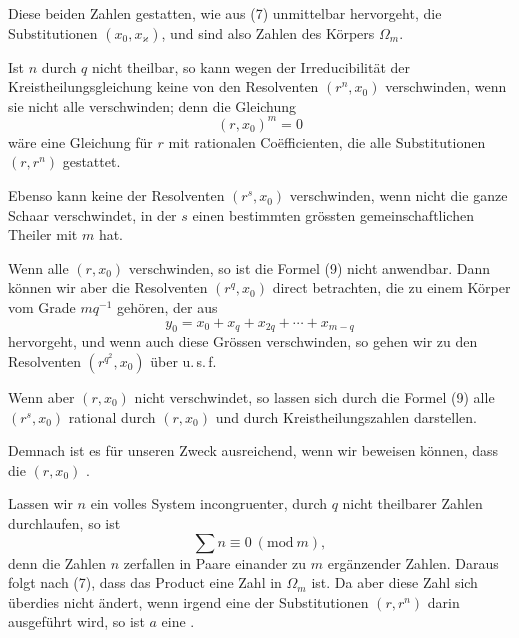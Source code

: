 
Diese beiden Zahlen gestatten, wie aus (7) unmittelbar hervorgeht, die Substitutionen $(x_0, x_\varkappa)$, und sind also Zahlen des Körpers $\Omega_m$.

Ist $n$ durch $q$ nicht theilbar, so kann wegen der Irreducibilität der Kreistheilungsgleichung keine von den Resolventen $(r^n, x_0)$ verschwinden, wenn sie nicht alle verschwinden; denn die Gleichung
\[
(r, x_0)^m = 0
\]
wäre eine Gleichung für $r$ mit rationalen Co\"efficienten, die alle Substitutionen $(r, r^n)$ gestattet.

Ebenso kann keine der Resolventen $(r^s, x_0)$ verschwinden, wenn nicht die ganze Schaar verschwindet, in der $s$ einen bestimmten grössten gemeinschaftlichen Theiler mit $m$ hat.

Wenn alle $(r, x_0)$ verschwinden, so ist die Formel (9) nicht anwendbar. Dann können wir aber die Resolventen $(r^q, x_0)$ direct betrachten, die zu einem Körper vom Grade $m q^{-1}$ gehören, der aus
\[
y_0 = x_0 + x_q + x_{2q} + \cdots + x_{m-q}
\]
hervorgeht, und wenn auch diese Grössen verschwinden, so gehen wir zu den Resolventen $(r^{q^2}, x_0)$ über u.\,s.\,f.

Wenn aber $(r, x_0)$ nicht verschwindet, so lassen sich durch die Formel (9) alle $(r^s, x_0)$ rational durch $(r, x_0)$ und durch Kreistheilungszahlen darstellen.

Demnach ist es für unseren Zweck ausreichend, wenn wir beweisen können, dass die  $(r, x_0)$ .

Lassen wir $n$ ein volles System incongruenter, durch $q$ nicht theilbarer Zahlen durchlaufen, so ist
\[
\sum n \equiv 0 \ (\mathrm{mod}\ m),
\]
denn die Zahlen $n$ zerfallen in Paare einander zu $m$ ergänzender Zahlen. Daraus folgt nach (7), dass das Product
eine Zahl in $\Omega_m$ ist. Da aber diese Zahl sich überdies nicht ändert, wenn irgend eine der Substitutionen $(r, r^n)$ darin ausgeführt wird, so ist $a$ eine .
